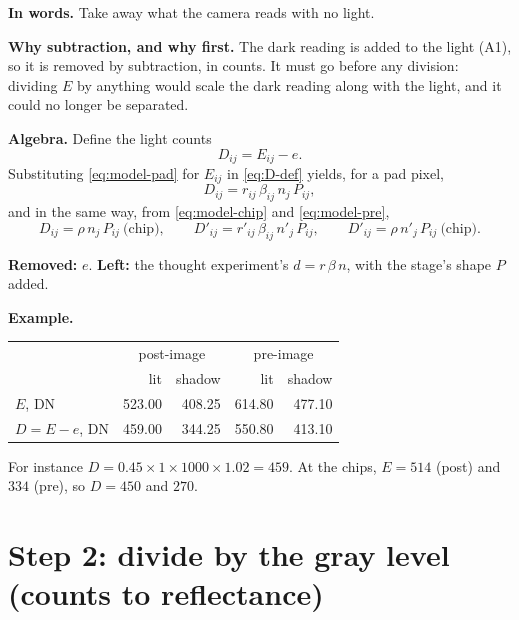 \documentclass[11pt,letter]{article}
\begin{document}
\textbf{In words.}  Take away what the camera reads with no light.

\textbf{Why subtraction, and why first.}  The dark reading is added to the
light (A1), so it is removed by subtraction, in counts.  It must go before
any division: dividing $E$ by anything would scale the dark reading along
with the light, and it could no longer be separated.

\textbf{Algebra.}  Define the light counts
\begin{equation}
  D_{ij} = E_{ij} - e .
  \label{eq:D-def}
\end{equation}
Substituting \eqref{eq:model-pad} for $E_{ij}$ in \eqref{eq:D-def} yields,
for a pad pixel,
\begin{equation}
  D_{ij} = r_{ij}\, \beta_{ij}\, n_j\, P_{ij} ,
  \label{eq:D}
\end{equation}
and in the same way, from \eqref{eq:model-chip} and \eqref{eq:model-pre},
\begin{equation}
  D_{ij} = \rho\, n_j\, P_{ij} \ \text{(chip)}, \qquad
  D'_{ij} = r'_{ij}\, \beta_{ij}\, n'_j\, P_{ij}, \qquad
  D'_{ij} = \rho\, n'_j\, P_{ij} \ \text{(chip)}.
  \label{eq:D-others}
\end{equation}

\textbf{Removed:} $e$.  \textbf{Left:} the thought experiment's
$d = r\,\beta\,n$, with the stage's shape $P$ added.

\textbf{Example.}

\medskip
\begin{center}
\begin{tabular}{@{}lrrrr@{}}
\toprule
 & \multicolumn{2}{c}{post-image} & \multicolumn{2}{c}{pre-image} \\
 & lit & shadow & lit & shadow \\
\midrule
$E$, DN & 523.00 & 408.25 & 614.80 & 477.10 \\
$D = E - e$, DN & 459.00 & 344.25 & 550.80 & 413.10 \\
\bottomrule
\end{tabular}
\end{center}
\noindent For instance $D = 0.45 \times 1 \times 1000 \times 1.02 = 459$.
At the chips, $E = 514$ (post) and $334$ (pre), so $D = 450$ and $270$.

\section{Step 2: divide by the gray level (counts to reflectance)}
\label{sec:gray}
\end{document}
